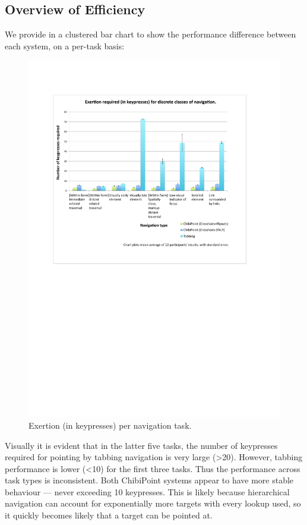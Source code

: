 \documentclass[a4paper, 12pt]{report}
\begin{document}
\subsection{Overview of Efficiency}
We provide in  a clustered bar chart to show the performance difference between each system, on a per-task basis:
\begin{figure}[ht]
\centerline{\includegraphics[width=8in]{figures/Exertion2.pdf}}
\caption{Exertion (in keypresses) per navigation task.}
\label{fig:exertion}
\end{figure}
\FloatBarrier
Visually it is evident that in the latter five tasks, the number of keypresses required for pointing by tabbing navigation is very large (>20). However, tabbing performance is lower (<10) for the first three tasks. Thus the performance across task types is inconsistent. Both ChibiPoint systems appear to have more stable behaviour --- never exceeding 10 keypresses. This is likely because hierarchical navigation can account for exponentially more targets with every lookup used, so it quickly becomes likely that a target can be pointed at.
\end{document}
